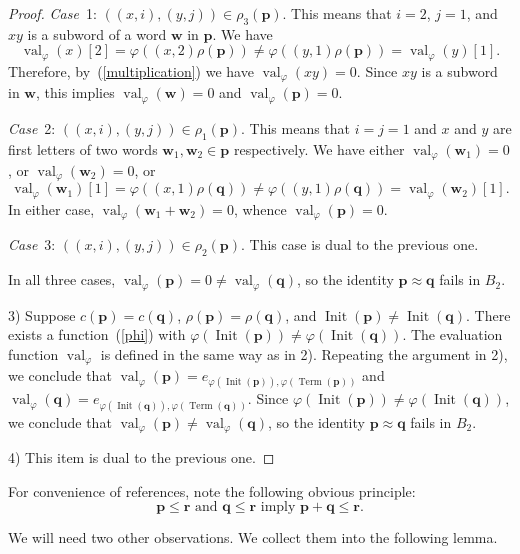 \documentclass[12pt,draft]{amsart}
\DeclareMathOperator{\init}{Init}
\DeclareMathOperator{\term}{Term}
\DeclareMathOperator{\val}{val}
\begin{document}
\begin{proof}
\emph{Case}~1: $((x,i),(y,j))\in\rho_3(\mathbf p)$. This means that $i=2$, $j=1$, and $xy$ is a subword of a word $\mathbf w$ in $\mathbf p$. We have
$$\val_{\varphi}(x)[2]=\varphi((x,2)\rho(\mathbf p))\neq\varphi((y,1)\rho(\mathbf p))=\val_{\varphi}(y)[1].$$ 
Therefore, by~(\ref{multiplication}) we have $\val_{\varphi}(xy)=0$. Since $xy$ is a subword in $\mathbf w$, this implies $\val_{\varphi}(\mathbf w)=0$ and $\val_{\varphi}(\mathbf p)=0$.

\emph{Case}~2: $((x,i),(y,j))\in\rho_1(\mathbf p)$. This means that $i=j=1$ and $x$ and $y$ are first letters of two words $\mathbf w_1,\mathbf w_2\in\mathbf p$ respectively. We have either $\val_{\varphi}(\mathbf w_1)=0$, or $\val_{\varphi}(\mathbf w_2)=0$, or 
$$\val_{\varphi}(\mathbf w_1)[1]=\varphi((x,1)\rho(\mathbf q))\neq\varphi((y,1)\rho(\mathbf q))=\val_{\varphi}(\mathbf w_2)[1].$$ 
In either case, $\val_{\varphi}(\mathbf w_1+\mathbf w_2)=0$, whence $\val_{\varphi}(\mathbf p)=0$.

\emph{Case}~3: $((x,i),(y,j))\in\rho_2(\mathbf p)$. This case is dual to the previous one.

In all three cases, $\val_{\varphi}(\mathbf p)=0\neq\val_{\varphi}(\mathbf q)$, so the identity $\mathbf p\approx\mathbf q$ fails in $B_2$.

3) Suppose $c(\mathbf p)=c(\mathbf q)$, $\rho(\mathbf p)=\rho(\mathbf q)$, and $\init(\mathbf p)\neq\init(\mathbf q)$. There exists a function~(\ref{phi}) with $\varphi(\init(\mathbf p))\neq\varphi(\init(\mathbf q))$. The evaluation function $\val_{\varphi}$ is defined in the same way as in 2). Repeating the argument in 2), we conclude that $\val_{\varphi}(\mathbf p)=e_{\varphi(\init(\mathbf p)),\varphi(\term(\mathbf p))}$ and $\val_{\varphi}(\mathbf q)=e_{\varphi(\init(\mathbf q)),\varphi(\term(\mathbf q))}$. Since $\varphi(\init(\mathbf p))\neq\varphi(\init(\mathbf q))$, we conclude that $\val_{\varphi}(\mathbf p)\neq\val_{\varphi}(\mathbf q)$, so the identity $\mathbf p\approx\mathbf q$ fails in $B_2$.

4) This item is dual to the previous one.
\end{proof}

For convenience of references, note the following obvious principle:
\begin{equation}
\label{adding inequalities}\mathbf p\le\mathbf r\text{ and }\mathbf q\le\mathbf  r\text{ imply }\mathbf p+\mathbf q\le\mathbf r.
\end{equation}

We will need two other observations. We collect them into the following lemma.
\end{document}
